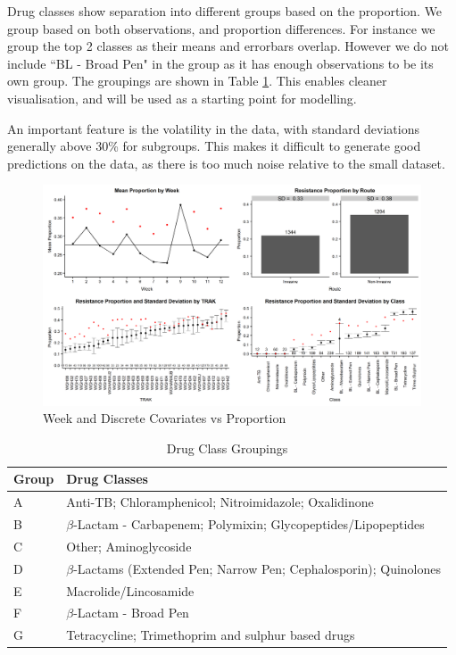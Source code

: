 \documentclass[11pt,twoside]{article}
\numberwithin{Theorem}{section}
\numberwithin{Definition}{section}
\numberwithin{Lemma}{section}
\numberwithin{Algorithm}{section}
\numberwithin{equation}{section}
\begin{document}
Drug classes show separation into different groups based on the proportion. We group based on both observations, and proportion differences. For instance we group the top 2 classes as their means and errorbars overlap. However we do not include ``BL - Broad Pen" in the group as it has enough observations to be its own group. The groupings are shown in Table \ref{table::1}. This enables cleaner visualisation, and will be used as a starting point for modelling. 

An important feature is the volatility in the data, with standard deviations generally above 30\% for subgroups. This makes it difficult to generate good predictions on the data, as there is too much noise relative to the small dataset. 

\begin{figure}[h!]
	\centering
	\includegraphics[width=1\textwidth]{Figures/2_1_EDA_Fact_Grid.png}
	\caption{Week and Discrete Covariates vs Proportion} \label{fig::2_1_EDA_Fact}
\end{figure}

\begin{table}[h!]
	\centering
	\begin{tabular}{|l|l|}
		\hline 
		Group & Drug Classes \\  \hline 
		A     & Anti-TB; Chloramphenicol; Nitroimidazole; Oxalidinone \\ 
		B     & $\beta$-Lactam - Carbapenem; Polymixin; Glycopeptides/Lipopeptides \\ 
		C     & Other; Aminoglycoside \\ 
		D     & $\beta$-Lactams (Extended Pen; Narrow Pen; Cephalosporin); Quinolones\\ 
		E     & Macrolide/Lincosamide  \\ 
		F     & $\beta$-Lactam - Broad Pen             \\ 
		G     & Tetracycline; Trimethoprim and sulphur based drugs \\ \hline
	\end{tabular} \caption{Drug Class Groupings}\label{table::1}
\end{table}
\end{document}
